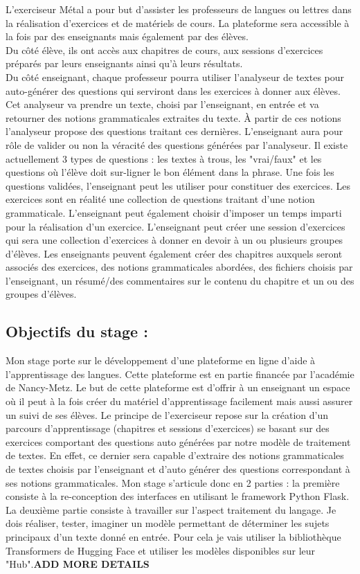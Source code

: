 \documentclass[12pt]{article}
\begin{document}
L'exerciseur Métal a pour but d'assister les professeurs de langues ou lettres dans la réalisation d'exercices et de matériels de cours. La plateforme sera accessible à la fois par des enseignants mais également par des élèves. \\
Du côté élève, ils ont accès aux chapitres de cours, aux sessions d'exercices préparés par leurs enseignants ainsi qu'à leurs résultats. \\
Du côté enseignant, chaque professeur pourra utiliser l'analyseur de textes pour auto-générer des questions qui serviront dans les exercices à donner aux élèves. Cet analyseur va prendre un texte, choisi par l'enseignant, en entrée et va retourner des notions grammaticales extraites du texte. À partir de ces notions l'analyseur propose des questions traitant ces dernières. L'enseignant aura pour rôle de valider ou non la véracité des questions générées par l'analyseur. Il existe actuellement 3 types de questions : les textes à trous, les "vrai/faux" et les questions où l'élève doit sur-ligner le bon élément dans la phrase. 
Une fois les questions validées, l'enseignant peut les utiliser pour constituer des exercices. Les exercices sont en réalité une collection de questions traitant d'une notion grammaticale. L'enseignant peut également choisir d'imposer un temps imparti pour la réalisation d'un exercice.
L'enseignant peut créer une session d'exercices qui sera une collection d'exercices à donner en devoir à un ou plusieurs groupes d'élèves.
Les enseignants peuvent également créer des chapitres auxquels seront associés des exercices, des notions grammaticales abordées, des fichiers choisis par l'enseignant, un résumé/des commentaires sur le contenu du chapitre et un ou des groupes d'élèves.

\subsection{Objectifs du stage :}

Mon stage porte sur le développement d’une plateforme en ligne d’aide à l’apprentissage des langues. Cette plateforme est en partie financée par l’académie de Nancy-Metz. Le but de cette plateforme est d’offrir à un enseignant un espace où il peut à la fois créer du matériel d'apprentissage facilement mais aussi assurer un suivi de ses élèves. Le principe de l'exerciseur repose sur la création d'un parcours d'apprentissage (chapitres et sessions d'exercices) se basant sur des exercices comportant des questions auto générées par notre modèle de traitement de textes. En effet, ce dernier sera capable d'extraire des notions grammaticales de textes choisis par l'enseignant et d'auto générer des questions correspondant à ses notions grammaticales. 
Mon stage s’articule donc en 2 parties : la première consiste à la re-conception des interfaces en utilisant le framework Python Flask. La deuxième partie consiste à travailler sur l’aspect traitement du langage. Je dois réaliser, tester, imaginer un modèle permettant de déterminer les sujets principaux d'un texte donné en entrée. Pour cela je vais utiliser la bibliothèque Transformers de Hugging Face et utiliser les modèles disponibles sur leur "Hub".\textbf{ADD MORE DETAILS} 
\end{document}

